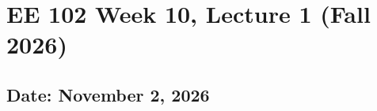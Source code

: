 \documentclass{ee102_notes}
\renewcommand{\releasedate}{November 2, 2026}
\begin{document}
\section*{EE 102 Week 10, Lecture 1 (Fall 2026)}
\subsection*{Date: \releasedate}
\tableofcontents

\end{document}
